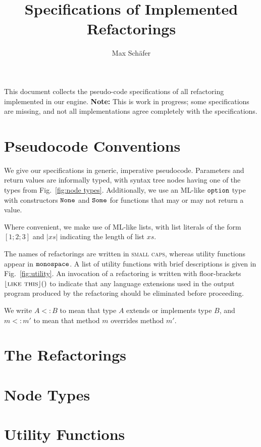 \documentclass{article}
\title{Specifications of Implemented Refactorings}
\author{Max Sch\"afer}
\newcommand{\refactoring}[1]{\textsc{#1}}
\newcommand{\refactoringNoExt}[1]{\lfloor\refactoring{#1}\rfloor}
\newcommand{\util}[1]{\ensuremath{\text{\texttt{#1}}}}
\begin{document}
\maketitle

This document collects the pseudo-code specifications of all refactoring implemented in our engine. \textbf{Note:} This is work in progress; some specifications are missing, and not all implementations agree completely with the specifications.

\section{Pseudocode Conventions}
We give our specifications in generic, imperative pseudocode. Parameters and return values are informally typed, with syntax tree nodes having one of the types from Fig.~\ref{fig:node types}. Additionally, we use an ML-like \util{option} type with constructors \util{None} and \util{Some} for functions that may or may not return a value.

Where convenient, we make use of ML-like lists, with list literals of the form $[1; 2; 3]$ and $|xs|$ indicating the length of list $xs$.

The names of refactorings are written in \refactoring{small caps}, whereas utility functions appear in \util{monospace}. A list of utility functions with brief descriptions is given in Fig.~\ref{fig:utility}. An invocation of a refactoring is written with floor-brackets $\refactoringNoExt{like this}()$ to indicate that any language extensions used in the output program produced by the refactoring should be eliminated before proceeding.

We write $A<:B$ to mean that type $A$ extends or implements type $B$, and $m<:m'$ to mean that method $m$ overrides method $m'$.

\section{The Refactorings}
























\section{Node Types}


\section{Utility Functions}


\listofalgorithms
\end{document}
